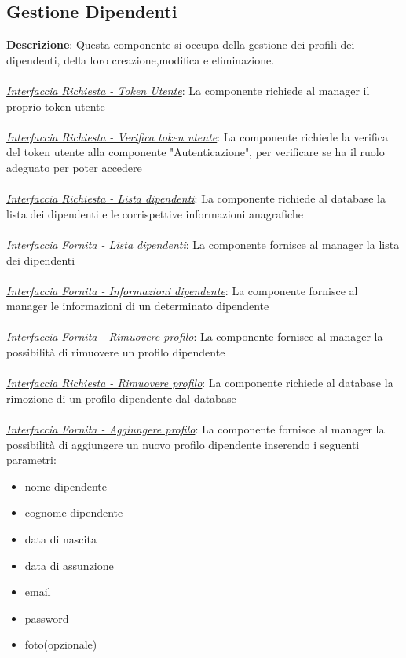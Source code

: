 \documentclass{report}
\begin{document}
\subsection*{Gestione Dipendenti}
\textbf{Descrizione}: Questa componente si occupa della gestione dei profili dei dipendenti, della loro creazione,modifica e eliminazione.\\\\
\uline{\textit{Interfaccia Richiesta - Token Utente}}:
La componente richiede al manager il proprio token utente \\ \\
\uline{\textit{Interfaccia Richiesta - Verifica token utente}}: 
La componente richiede la verifica del token utente alla componente "Autenticazione", per verificare se ha il ruolo adeguato per poter accedere \\ \\ 
\uline{\textit{Interfaccia Richiesta - Lista dipendenti}}:
La componente richiede al database la lista dei dipendenti e le corrispettive informazioni anagrafiche\\\\
\uline{\textit{Interfaccia Fornita - Lista dipendenti}}:
La componente fornisce al manager la lista dei dipendenti\\\\
\uline{\textit{Interfaccia Fornita - Informazioni dipendente}}:
La componente fornisce al manager le informazioni di un determinato dipendente\\\\
\uline{\textit{Interfaccia Fornita - Rimuovere profilo}}:
La componente fornisce al manager la possibilità di rimuovere un profilo dipendente\\\\
\uline{\textit{Interfaccia Richiesta - Rimuovere profilo}}:
La componente richiede al database la rimozione di un profilo dipendente dal database\\\\
\uline{\textit{Interfaccia Fornita - Aggiungere profilo}}:
La componente fornisce al manager la possibilità di aggiungere un nuovo profilo dipendente inserendo i seguenti parametri:
\begin{itemize}
	\item nome dipendente
	\item cognome dipendente
	\item data di nascita
	\item data di assunzione
	\item email 
	\item password
	\item foto(opzionale)
\end{itemize}
\end{document}
